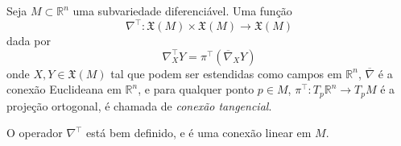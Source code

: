 \begin{definicao}
	Seja $M \subset \mathbb{R}^n$ uma subvariedade diferenciável. Uma função
	\begin{equation*}
		\nabla^\top: \mathfrak{X}(M) \times \mathfrak{X}(M) \rightarrow \mathfrak{X}(M)
	\end{equation*}
	dada por
	\begin{equation*}
		\nabla^\top_X Y = \pi^\top \left( \overline{\nabla}_X Y \right)
	\end{equation*}
	onde $X,Y \in \mathfrak{X}(M)$ tal que podem ser estendidas como campos em $\mathbb{R}^n$, $\overline{\nabla}$ é a conexão Euclideana em $\mathbb{R}^n$, e para qualquer ponto $p \in M$, $\pi^\top: T_p \mathbb{R}^n \rightarrow T_p M$ é a projeção ortogonal, é chamada de \emph{conexão tangencial}.
\end{definicao}

\begin{lema}\label{boa-definicao-conexao-tangencial}
	O operador $\nabla^\top$ está bem definido, e é uma conexão linear em $M$.
\end{lema}

